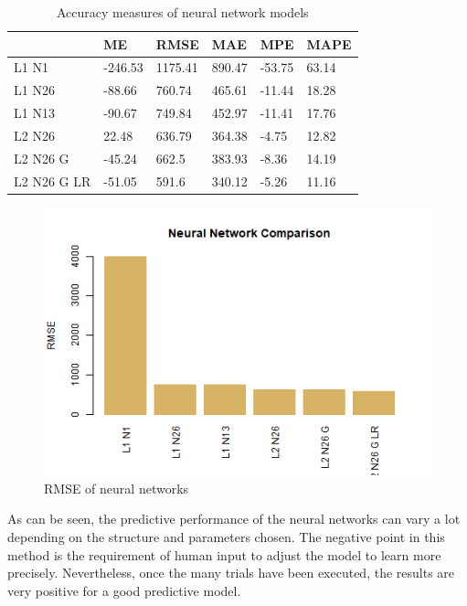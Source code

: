 \documentclass[
  paper=a4,
  ,captions=tableheading
]{scrartcl}
\begin{document}
\begin{table}[!h]

\caption{\label{tab:NN Summary}Accuracy measures of neural network models}
\centering
\begin{tabu} to 
\hline
  & ME & RMSE & MAE & MPE & MAPE\\
\hline
L1 N1 & -246.53 & 1175.41 & 890.47 & -53.75 & 63.14\\
\hline
L1 N26 & -88.66 & 760.74 & 465.61 & -11.44 & 18.28\\
\hline
L1 N13 & -90.67 & 749.84 & 452.97 & -11.41 & 17.76\\
\hline
L2 N26 & 22.48 & 636.79 & 364.38 & -4.75 & 12.82\\
\hline
L2 N26 G & -45.24 & 662.5 & 383.93 & -8.36 & 14.19\\
\hline
L2 N26 G LR & -51.05 & 591.6 & 340.12 & -5.26 & 11.16\\
\hline
\end{tabu}
\end{table}

\begin{figure}[H]

{\centering \includegraphics[width=0.5\linewidth,]{Diamonds_PDF_files/figure-latex/NN Summary-1} 

}

\caption{RMSE of neural networks}\label{fig:NN Summary}
\end{figure}

As can be seen, the predictive performance of the neural networks can
vary a lot depending on the structure and parameters chosen. The
negative point in this method is the requirement of human input to
adjust the model to learn more precisely. Nevertheless, once the many
trials have been executed, the results are very positive for a good
predictive model.
\end{document}
